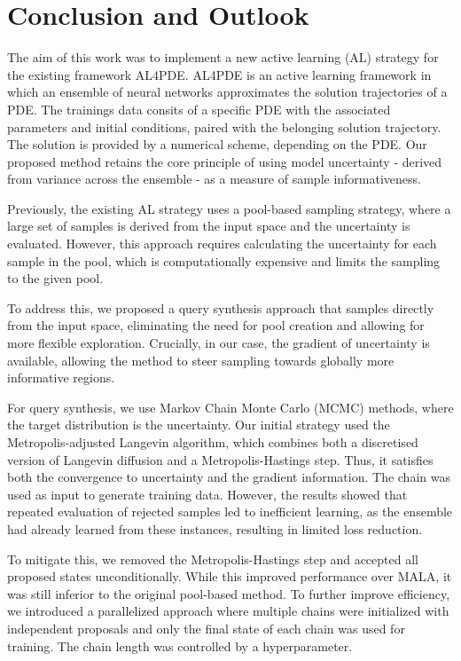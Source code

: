 \chapter{Conclusion and Outlook}\label{chap:zusfas}
The aim of this work was to implement a new active learning (AL) strategy for the existing framework AL4PDE. 
AL4PDE is an active learning framework in which an ensemble of neural networks approximates the solution trajectories of a PDE. The trainings data consits of a specific PDE with the associated parameters and initial conditions, paired with the belonging solution trajectory. The solution is provided by a numerical scheme, depending on the PDE. 
Our proposed method retains the core principle of using model uncertainty - derived from variance across the ensemble - as a measure of sample informativeness.

Previously, the existing AL strategy uses a pool-based sampling strategy, where a large set of samples is derived from the input space and the uncertainty is evaluated. However, this approach requires calculating the uncertainty for each sample in the pool, which is computationally expensive and limits the sampling to the given pool. 

To address this, we proposed a query synthesis approach that samples directly from the input space, eliminating the need for pool creation and allowing for more flexible exploration.
Crucially, in our case, the gradient of uncertainty is available, allowing the method to steer sampling towards globally more informative regions. 

For query synthesis, we use Markov Chain Monte Carlo (MCMC) methods, where the target distribution is the uncertainty.
Our initial strategy used the Metropolis-adjusted Langevin algorithm, which combines both a discretised version of Langevin diffusion and a Metropolis-Hastings step. Thus, it satisfies both the convergence to uncertainty and the gradient information. The chain was used as input to generate training data. However, the results showed that repeated evaluation of rejected samples led to inefficient learning, as the ensemble had already learned from these instances, resulting in limited loss reduction.

To mitigate this, we removed the Metropolis-Hastings step and accepted all proposed states unconditionally. While this improved performance over MALA, it was still inferior to the original pool-based method. To further improve efficiency, we introduced a parallelized approach where multiple chains were initialized with independent proposals and only the final state of each chain was used for training. The chain length was controlled by a hyperparameter.

